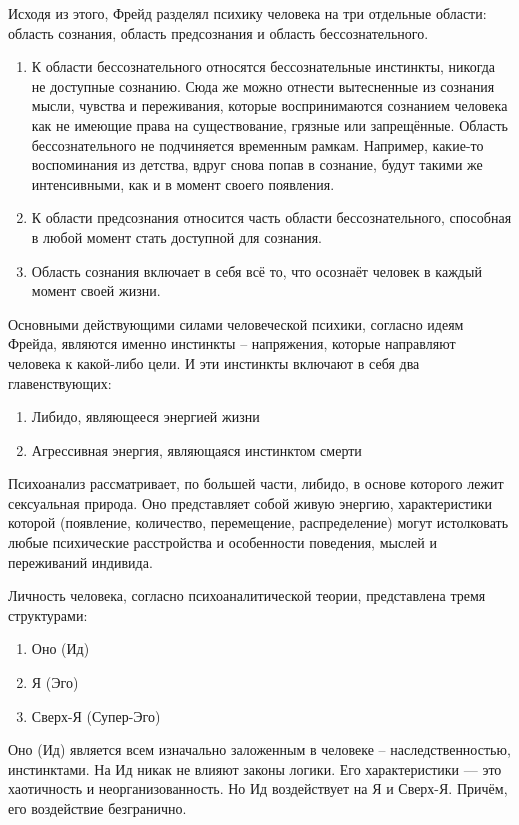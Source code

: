 Исходя из этого, Фрейд разделял психику человека на три отдельные области: область сознания, область предсознания и область бессознательного.

\begin{enumerate}
    \item К области бессознательного относятся бессознательные инстинкты, никогда не доступные сознанию. Сюда же можно отнести вытесненные из сознания мысли, чувства и переживания, которые воспринимаются сознанием человека как не имеющие права на существование, грязные или запрещённые. Область бессознательного не подчиняется временным рамкам. Например, какие-то воспоминания из детства, вдруг снова попав в сознание, будут такими же интенсивными, как и в момент своего появления.
    \item К области предсознания относится часть области бессознательного, способная в любой момент стать доступной для сознания.
    \item Область сознания включает в себя всё то, что осознаёт человек в каждый момент своей жизни.
\end{enumerate}

Основными действующими силами человеческой психики, согласно идеям Фрейда, являются именно инстинкты – напряжения, которые направляют человека к какой-либо цели. И эти инстинкты включают в себя два главенствующих:

\begin{enumerate}
    \item Либидо, являющееся энергией жизни
    \item Агрессивная энергия, являющаяся инстинктом смерти
\end{enumerate}

Психоанализ рассматривает, по большей части, либидо, в основе которого лежит сексуальная природа. Оно представляет собой живую энергию, характеристики которой (появление, количество, перемещение, распределение) могут истолковать любые психические расстройства и особенности поведения, мыслей и переживаний индивида.

Личность человека, согласно психоаналитической теории, представлена тремя структурами:
\begin{enumerate}
    \item Оно (Ид)
    \item Я (Эго)
    \item Сверх-Я (Супер-Эго)
\end{enumerate}

Оно (Ид) является всем изначально заложенным в человеке – наследственностью, инстинктами. На Ид никак не влияют законы логики. Его характеристики  ---  это хаотичность и неорганизованность. Но Ид воздействует на Я и Сверх-Я. Причём, его воздействие безгранично.

